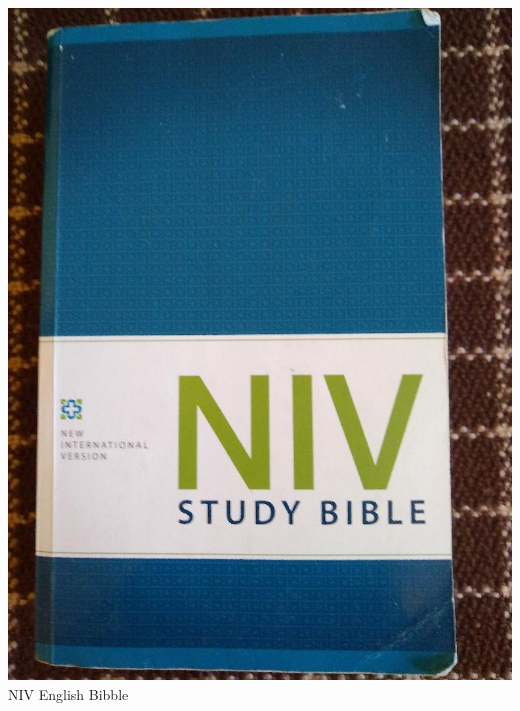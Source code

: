 \documentclass[t]{beamer}
\newcommand{\htarget}[2]{\hypertarget{#1}{#2}}
\begin{document}
\begin{frame}\htarget{NIV}{} \begin{center}
\includegraphics[height=0.8\textheight]{NIV_bible_mini.jpg} \\
NIV English Bibble
\end{center} \end{frame}
\end{document}
